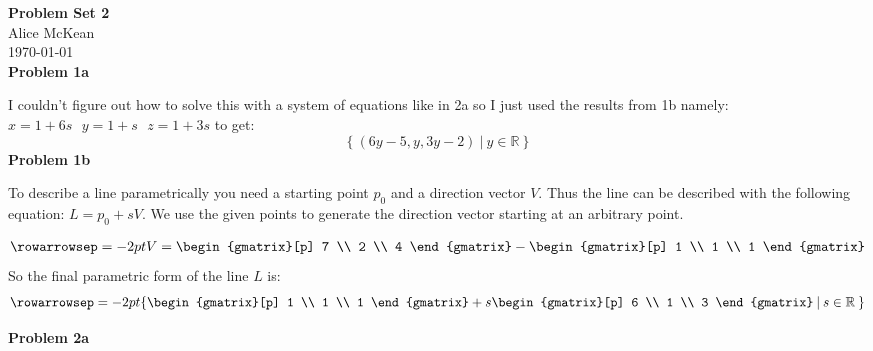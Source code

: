 \documentclass{article}
\newcommand{\problem}[1]{\large\textbf{Problem #1}\normalsize}
\begin{document}
\noindent\Large\textbf{Problem Set 2} \\
\normalsize
Alice McKean \\
\today \\

\problem{1a}

I couldn't figure out how to solve this with a system of equations like in 2a so
I just used the results from 1b namely: $x = 1 + 6s \:\:\: y = 1 + s \:\:\: z = 1 + 3s$
to get:
\begin{equation*}
  \{ \: (6y - 5, y, 3y - 2) \: | \: y \in \mathbb{R} \: \}
\end{equation*}
\problem{1b}

To describe a line parametrically you need a starting point $p_0$ and a direction
vector $V$. Thus the line can be described with the following equation: $L = p_0 + sV$.
We use the given points to generate
the direction vector starting at an arbitrary point.

\begin{align*}
  \rowarrowsep=-2pt
  V =
  \begin{gmatrix}[p]
    7 \\
    2 \\
    4
  \end{gmatrix} 
  -
  \begin{gmatrix}[p]
    1 \\
    1 \\
    1
  \end{gmatrix} 
\end{align*}
So the final parametric form of the line $L$ is:
\begin{equation*}
  \rowarrowsep=-2pt
  \{
  \begin{gmatrix}[p]
    1 \\
    1 \\
    1
  \end{gmatrix} 
  +
  s
  \begin{gmatrix}[p]
    6 \\
    1 \\
    3
  \end{gmatrix} 
  \: | \: s \in \mathbb{R} \: \}
\end{equation*}


\problem{2a}
\end{document}
